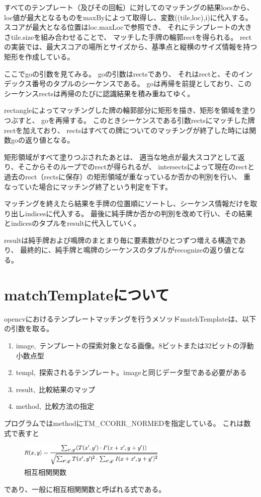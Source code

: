 \documentclass{jsarticle}
\begin{document}
\begin{multicols}{2}
すべてのテンプレート（及びその回転）に対してのマッチングの結果locsから、
loc値が最大となるものをmaxByによって取得し、変数((tile,loc),i)に代入する。
スコアが最大となる位置はloc.maxLocで参照でき、
それにテンプレートの大きさtile.sizeを組み合わせることで、
マッチした手牌の輪郭rectを得られる。
rectの実装では、最大スコアの場所とサイズから、基準点と縦横のサイズ情報を持つ矩形を作成している。

ここでgoの引数を見てみる。
goの引数はrectsであり、
それはrectと、そのインデックス番号のタプルのシーケンスである。
goは再帰を前提としており、このシーケンスrectsは再帰のたびに認識結果を積み重ねてゆく。

rectangleによってマッチングした牌の輪郭部分に矩形を描き、矩形を領域を塗りつぶすと、
goを再帰する。
このときシーケンスである引数rectsにマッチした牌rectを加えており、
rectsはすべての牌についてのマッチングが終了した時には関数goの返り値となる。

矩形領域がすべて塗りつぶされたあとは、
適当な地点が最大スコアとして返り、そこからそのループでのrectが得られるが、
intersectsによって現在のrectと過去のrect（rectsに保存）の矩形領域が重なっているか否かの判別を行い、
重なっていた場合にマッチング終了という判定を下す。

マッチングを終えたら結果を手牌の位置順にソートし、シーケンス情報だけを取り出しindicesに代入する。
最後に純手牌か否かの判別を改めて行い、その結果とindicesのタプルをresultに代入していく。

resultは純手牌および鳴牌のまとまり毎に要素数がひとつずつ増える構造であり、
最終的に、純手牌と鳴牌のシーケンスのタプルがrecognizeの返り値となる。

\section{matchTemplateについて}

opencvにおけるテンプレートマッチングを行うメソッドmatchTemplateは、以下の引数を取る。
\begin{enumerate}
\item image,\ テンプレートの探索対象となる画像。8ビットまたは32ビットの浮動小数点型
\item templ,\ 探索されるテンプレート。imageと同じデータ型である必要がある
\item result,\ 比較結果のマップ
\item method,\ 比較方法の指定
\end{enumerate}

プログラムではmethodにTM\_CCORR\_NORMEDを指定している。
これは数式で表すと
\begin{figure}[H]
  \begin{center}
    \includegraphics[clip,width=7.0cm]{./img/ccorr.png}
    \caption{相互相関関数}
    \label{fig:ccorr}
  \end{center}
\end{figure}
であり、一般に相互相関関数と呼ばれる式である。


\end{multicols}
\end{document}
